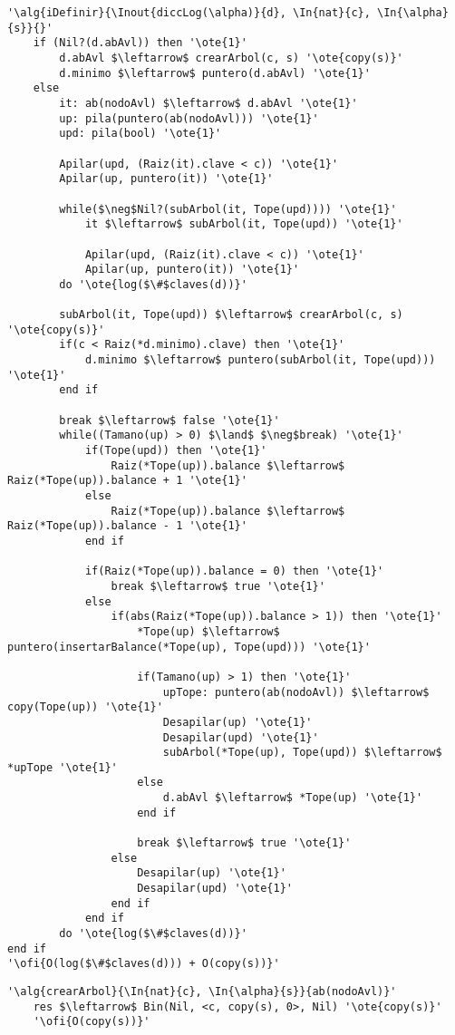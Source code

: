 \pagebreak
\begin{lstlisting}[mathescape]
'\alg{iDefinir}{\Inout{diccLog(\alpha)}{d}, \In{nat}{c}, \In{\alpha}{s}}{}'
	if (Nil?(d.abAvl)) then '\ote{1}'
		d.abAvl $\leftarrow$ crearArbol(c, s) '\ote{copy(s)}'
		d.minimo $\leftarrow$ puntero(d.abAvl) '\ote{1}'
	else
		it: ab(nodoAvl) $\leftarrow$ d.abAvl '\ote{1}'
		up: pila(puntero(ab(nodoAvl))) '\ote{1}'
		upd: pila(bool) '\ote{1}'

		Apilar(upd, (Raiz(it).clave < c)) '\ote{1}'
		Apilar(up, puntero(it)) '\ote{1}'

		while($\neg$Nil?(subArbol(it, Tope(upd)))) '\ote{1}'
			it $\leftarrow$ subArbol(it, Tope(upd)) '\ote{1}'

			Apilar(upd, (Raiz(it).clave < c)) '\ote{1}'
			Apilar(up, puntero(it)) '\ote{1}'
		do '\ote{log($\#$claves(d))}'

		subArbol(it, Tope(upd)) $\leftarrow$ crearArbol(c, s) '\ote{copy(s)}'
		if(c < Raiz(*d.minimo).clave) then '\ote{1}'
			d.minimo $\leftarrow$ puntero(subArbol(it, Tope(upd))) '\ote{1}'
		end if

		break $\leftarrow$ false '\ote{1}'
		while((Tamano(up) > 0) $\land$ $\neg$break) '\ote{1}'
			if(Tope(upd)) then '\ote{1}'
				Raiz(*Tope(up)).balance $\leftarrow$ Raiz(*Tope(up)).balance + 1 '\ote{1}'
			else
				Raiz(*Tope(up)).balance $\leftarrow$ Raiz(*Tope(up)).balance - 1 '\ote{1}'
			end if

			if(Raiz(*Tope(up)).balance = 0) then '\ote{1}'
				break $\leftarrow$ true '\ote{1}'
			else
				if(abs(Raiz(*Tope(up)).balance > 1)) then '\ote{1}'
					*Tope(up) $\leftarrow$ puntero(insertarBalance(*Tope(up), Tope(upd))) '\ote{1}'

					if(Tamano(up) > 1) then '\ote{1}'
						upTope: puntero(ab(nodoAvl)) $\leftarrow$ copy(Tope(up)) '\ote{1}'
						Desapilar(up) '\ote{1}'
						Desapilar(upd) '\ote{1}'
						subArbol(*Tope(up), Tope(upd)) $\leftarrow$ *upTope '\ote{1}'
					else
						d.abAvl $\leftarrow$ *Tope(up) '\ote{1}'
					end if

					break $\leftarrow$ true '\ote{1}'
				else
					Desapilar(up) '\ote{1}'
					Desapilar(upd) '\ote{1}'
				end if
			end if
		do '\ote{log($\#$claves(d))}'
end if
'\ofi{O(log($\#$claves(d))) + O(copy(s))}'
\end{lstlisting}

\begin{lstlisting}[mathescape]
'\alg{crearArbol}{\In{nat}{c}, \In{\alpha}{s}}{ab(nodoAvl)}'
	res $\leftarrow$ Bin(Nil, <c, copy(s), 0>, Nil) '\ote{copy(s)}'
	'\ofi{O(copy(s))}'
\end{lstlisting}


